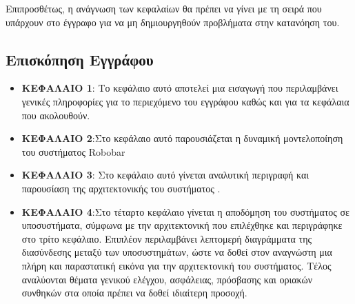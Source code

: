Επιπροσθέτως, η ανάγνωση των κεφαλαίων θα πρέπει να γίνει με τη σειρά
που υπάρχουν στο έγγραφο για να μη δημιουργηθούν προβλήματα στην
κατανόηση του.

\subsection{Επισκόπηση Εγγράφου}

\begin{itemize}[noitemsep,nolistsep]
	\item \textbf{ΚΕΦΑΛΑΙΟ 1}: Το κεφάλαιο αυτό αποτελεί μια
εισαγωγή που περιλαμβάνει γενικές πληροφορίες για το περιεχόμενο του
εγγράφου καθώς και για τα κεφάλαια που ακολουθούν.
	\item \textbf{ΚΕΦΑΛΑΙΟ 2}:Στο κεφάλαιο αυτό παρουσιάζεται η
δυναμική μοντελοποίηση του συστήματος Robobar
	\item \textbf{ΚΕΦΑΛΑΙΟ 3}: Στο κεφάλαιο αυτό γίνεται αναλυτική
περιγραφή και παρουσίαση της αρχιτεκτονικής του συστήματος .
	\item \textbf{ΚΕΦΑΛΑΙΟ 4}:Στο τέταρτο κεφάλαιο γίνεται η
αποδόμηση του συστήματος σε υποσυστήματα, σύμφωνα με την αρχιτεκτονική
που επιλέχθηκε και περιγράφηκε στο τρίτο κεφάλαιο. Επιπλέον
περιλαμβάνει λεπτομερή διαγράμματα της διασύνδεσης μεταξύ των
υποσυστημάτων, ώστε να δοθεί στον αναγνώστη μια πλήρη και παραστατική
εικόνα για την αρχιτεκτονική του συστήματος. Τέλος αναλύονται θέματα
γενικού ελέγχου, ασφάλειας, πρόσβασης και οριακών συνθηκών στα οποία
πρέπει να δοθεί ιδιαίτερη προσοχή.
\end{itemize}